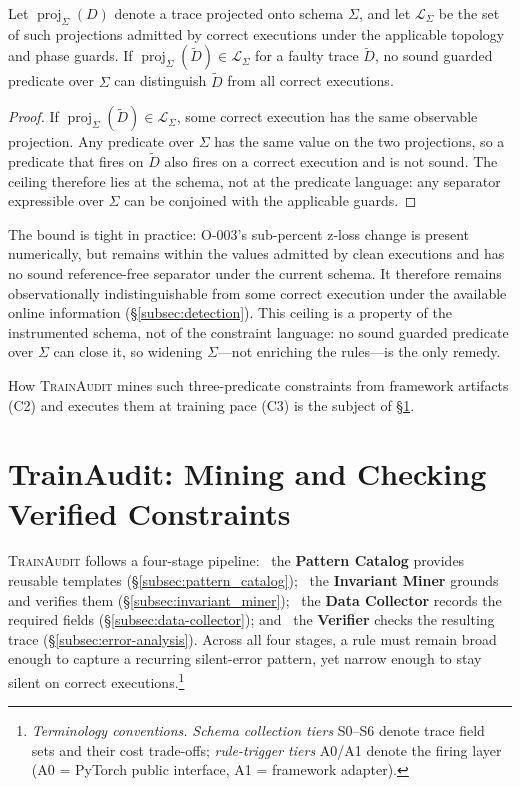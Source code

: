 \documentclass[sigconf,nonacm]{acmart}
\begin{document}
\begin{theorem}\label{thm:ceiling}
Let $\operatorname{proj}_{\Sigma}(D)$ denote a trace projected onto schema
$\Sigma$, and let $\mathcal{L}_{\Sigma}$ be the set of such projections
admitted by correct executions under the applicable topology and phase
guards. If
$\operatorname{proj}_{\Sigma}(\tilde D)\in\mathcal{L}_{\Sigma}$ for a faulty
trace $\tilde D$, no sound guarded predicate over $\Sigma$ can distinguish
$\tilde D$ from all correct executions.
\end{theorem}
\begin{proof}
If $\operatorname{proj}_{\Sigma}(\tilde D)\in\mathcal{L}_{\Sigma}$, some
correct execution has the same observable projection. Any predicate over
$\Sigma$ has the same value on the two projections, so a predicate that fires
on $\tilde D$ also fires on a correct execution and is not sound. The
ceiling therefore lies at the schema, not at the predicate language: any
separator expressible over $\Sigma$ can be conjoined with the applicable
guards.
\end{proof}

\noindent The bound is tight in practice: O-003's sub-percent z-loss change is
present numerically, but remains within the values admitted by clean
executions and has no sound reference-free separator under the current
schema. It therefore remains observationally indistinguishable from some
correct execution under the available online information
(\S\ref{subsec:detection}). This ceiling is a property of the instrumented
schema, not of the constraint language: no sound guarded predicate over
$\Sigma$ can close it, so widening $\Sigma$---not enriching the
rules---is the only remedy.

How \textsc{TrainAudit} mines such three-predicate constraints from framework artifacts (C2) and executes them at training pace (C3) is the subject of \S\ref{sec:overview}.

\section{TrainAudit: Mining and Checking Verified Constraints}
\label{sec:overview}
\label{sec:pattern-detection}

\textsc{TrainAudit} follows a four-stage pipeline: ~the
\textbf{Pattern Catalog} provides reusable templates
(\S\ref{subsec:pattern_catalog}); ~the \textbf{Invariant Miner}
grounds and verifies them (\S\ref{subsec:invariant_miner}); ~the
\textbf{Data Collector} records the required fields
(\S\ref{subsec:data-collector}); and ~the \textbf{Verifier} checks the
resulting trace (\S\ref{subsec:error-analysis}). Across all four stages, a rule
must remain broad enough to capture a recurring silent-error pattern, yet narrow
enough to stay silent on correct executions.\footnote{\emph{Terminology conventions.} \emph{Schema collection tiers}
S0--S6 denote trace field sets and their cost trade-offs; \emph{rule-trigger
tiers} A0/A1 denote the firing layer (A0 = PyTorch public interface, A1 =
framework adapter).}
\end{document}
